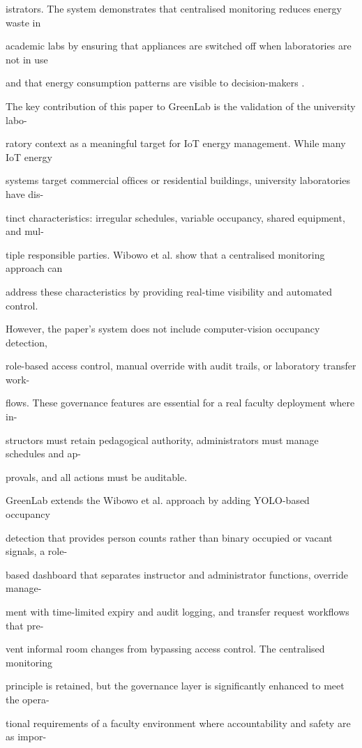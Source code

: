istrators. The system demonstrates that centralised monitoring reduces energy waste in

academic labs by ensuring that appliances are switched off when laboratories are not in use

and that energy consumption patterns are visible to decision-makers \cite{wibowo2023}.

The key contribution of this paper to GreenLab is the validation of the university labo-

ratory context as a meaningful target for IoT energy management. While many IoT energy

systems target commercial ofﬁces or residential buildings, university laboratories have dis-

tinct characteristics: irregular schedules, variable occupancy, shared equipment, and mul-

tiple responsible parties. Wibowo et al. show that a centralised monitoring approach can

address these characteristics by providing real-time visibility and automated control.

However, the paper's system does not include computer-vision occupancy detection,

role-based access control, manual override with audit trails, or laboratory transfer work-

ﬂows. These governance features are essential for a real faculty deployment where in-

structors must retain pedagogical authority, administrators must manage schedules and ap-

provals, and all actions must be auditable.

GreenLab extends the Wibowo et al. approach by adding YOLO-based occupancy

detection that provides person counts rather than binary occupied or vacant signals, a role-

based dashboard that separates instructor and administrator functions, override manage-

ment with time-limited expiry and audit logging, and transfer request workﬂows that pre-

vent informal room changes from bypassing access control. The centralised monitoring

principle is retained, but the governance layer is signiﬁcantly enhanced to meet the opera-

tional requirements of a faculty environment where accountability and safety are as impor-

